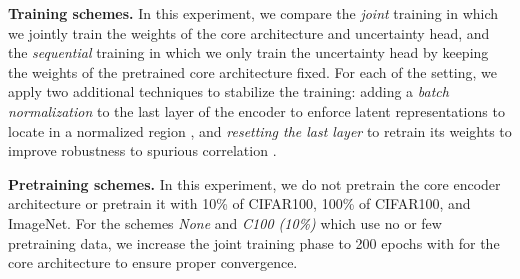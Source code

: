 \textbf{Training schemes.} In this experiment, we compare the \textit{joint} training in which we jointly train the weights of the core architecture and uncertainty head, and the \textit{sequential} training in which we only train the uncertainty head by keeping the weights of the pretrained core architecture fixed. For each of the setting, we apply two additional techniques to stabilize the training: adding a \textit{batch normalization} to the last layer of the encoder to enforce latent representations to locate in a normalized region \citep{ioffe2015bn,charpentier2022natpn}, and \textit{resetting the last layer} to retrain its weights to improve robustness to spurious correlation \citep{kirichenko2022reset}.

\textbf{Pretraining schemes.} In this experiment, we do not pretrain the core encoder architecture or pretrain it with 10\% of CIFAR100, 100\% of CIFAR100, and ImageNet. For the schemes \textit{None} and \textit{C100 (10\%)} which use no or few pretraining data, we increase the joint training phase to 200 epochs with for the core architecture to ensure proper convergence.


